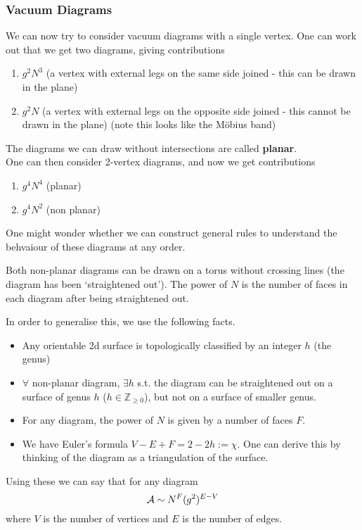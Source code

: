 \documentclass{article}
\begin{document}
\subsubsection{Vacuum Diagrams}
We can now try to consider vacuum diagrams with a single vertex. One can work out that we get two diagrams, giving contributions 
\begin{enumerate}
	\item $g^2 N^3$ (a vertex with external legs on the same side joined - this can be drawn in the plane)
	\item $g^2 N$ (a vertex with external legs on the opposite side joined - this cannot be drawn in the plane) (note this looks like the M\"obius band)
\end{enumerate}
The diagrams we can draw without intersections are called \textbf{planar}. \\
One can then consider 2-vertex diagrams, and now we get contributions 
\begin{enumerate}
	\item $g^4 N^4$ (planar)
	\item $g^4 N^2$ (non planar)
\end{enumerate} 
One might wonder whether we can construct general rules to understand the behvaiour of these diagrams at any order. 
\begin{remark}
	Both non-planar diagrams can be drawn on a torus without crossing lines (the diagram has been `straightened out'). The power of $N$ is the number of faces in each diagram after being straightened out. 
\end{remark}
In order to generalise this, we use the following facts.
\begin{itemize}
	\item Any orientable 2d surface is topologically classified by an integer $h$ (the genus) 
	\item $\forall$ non-planar diagram, $\exists h$ s.t. the diagram can be straightened out on a surface of genus $h$ ($h \in \mathbb{Z}_{\geq 0}$), but not on a surface of smaller genus. 
	\item For any diagram, the power of $N$ is given by a number of faces $F$.  
	\item We have Euler's formula $V-E+F = 2-2h := \chi$. One can derive this by thinking of the diagram as a triangulation of the surface. 
\end{itemize}
Using these we can say that for any diagram 
\[
\mathcal{A} \sim N^F (g^2)^{E-V}
\]
where $V$ is the number of vertices and $E$ is the number of edges. 
\end{document}
